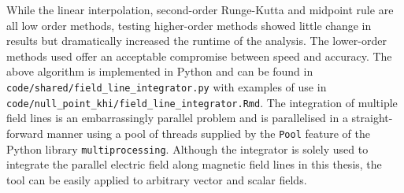 While the linear interpolation, second-order Runge-Kutta and midpoint rule are all low order methods, testing higher-order methods showed little change in results but dramatically increased the runtime of the analysis. The lower-order methods used offer an acceptable compromise between speed and accuracy. The above algorithm is implemented in Python and can be found in \verb|code/shared/field_line_integrator.py| with examples of use in \verb|code/null_point_khi/field_line_integrator.Rmd|. The integration of multiple field lines is an embarrassingly parallel problem and is parallelised in a straight-forward manner using a pool of threads supplied by the \verb|Pool| feature of the Python library \verb|multiprocessing|. Although the integrator is solely used to integrate the parallel electric field along magnetic field lines in this thesis, the tool can be easily applied to arbitrary vector and scalar fields.
